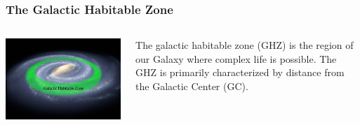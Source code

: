 \begin{frame}
\frametitle{The Galactic Habitable Zone}
\begin{columns}

\includegraphics[scale=0.35]{ghz2}

 
 The galactic habitable zone (GHZ) is the region of our Galaxy where complex life is possible. The GHZ is primarily characterized by distance from the Galactic Center (GC).
\end{columns}
\end{frame}

